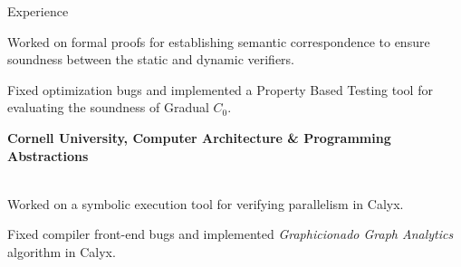 \begin{rSection}{Experience}
{\begin{minipage}{40em}
		\color{black}Worked on formal proofs for establishing semantic correspondence to ensure soundness between the static and dynamic verifiers.

		\color{black}Fixed optimization bugs and implemented a Property Based Testing tool for evaluating the soundness of Gradual $C_0$.
	\end{minipage}}
	
	\vspace*{2mm}

	{\textbf{\large{Cornell University, Computer Architecture \& Programming Abstractions}} \hfill \color{darkgray}{10/2021 - 12/2022} 
	\\ \vspace*{1mm}
	 \hfill \color{darkgray}{Ithaca, NY}
	\\
	\color{black}
	\begin{minipage}{40em}
		\color{black} Worked on a symbolic execution tool for verifying parallelism in Calyx.

		\color{black} Fixed compiler front-end bugs and implemented \textit{Graphicionado Graph Analytics} algorithm in Calyx.
	\end{minipage}} 

	\vspace*{2mm}

\end{rSection} 
